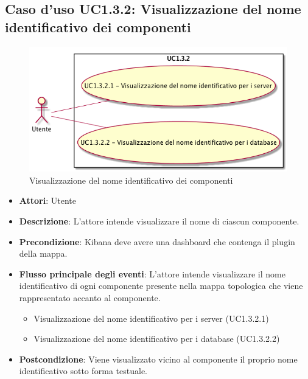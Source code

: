\subsection{Caso d'uso UC1.3.2: Visualizzazione del nome identificativo dei componenti}
\begin{figure} [H]
\centering
\includegraphics[scale=0.45]{./UC/UC1-3-2.png}
\caption{Visualizzazione del nome identificativo dei componenti}\label{}
\end{figure}
\begin{itemize}
\item \textbf{Attori}: Utente
\item \textbf{Descrizione}: L'attore intende visualizzare il nome di ciascun componente.
\item \textbf{Precondizione}: Kibana deve avere una dashboard che contenga il plugin della mappa.

\item \textbf{Flusso principale degli eventi}: L'attore intende visualizzare il nome identificativo di ogni componente presente nella mappa topologica che viene rappresentato accanto al componente.
\begin{itemize}
\item Visualizzazione del nome identificativo per i server (UC1.3.2.1)
\item Visualizzazione del nome identificativo per i database (UC1.3.2.2)
\end{itemize}
\item \textbf{Postcondizione}: Viene visualizzato vicino al componente il proprio nome identificativo sotto forma testuale.
\end{itemize}
